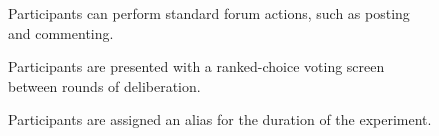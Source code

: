\begin{figure}
\label{fig:reply}
\center
{}
\caption{Participants can perform standard forum actions, such as posting and commenting.}
\end{figure}

\begin{figure}
\label{fig:vote}
\center
{}
\caption{Participants are presented with a ranked-choice voting screen between rounds of deliberation.}
\end{figure}

\begin{figure}
\label{fig:alias}
\center
{}
\caption{Participants are assigned an alias for the duration of the experiment.}
\end{figure}

